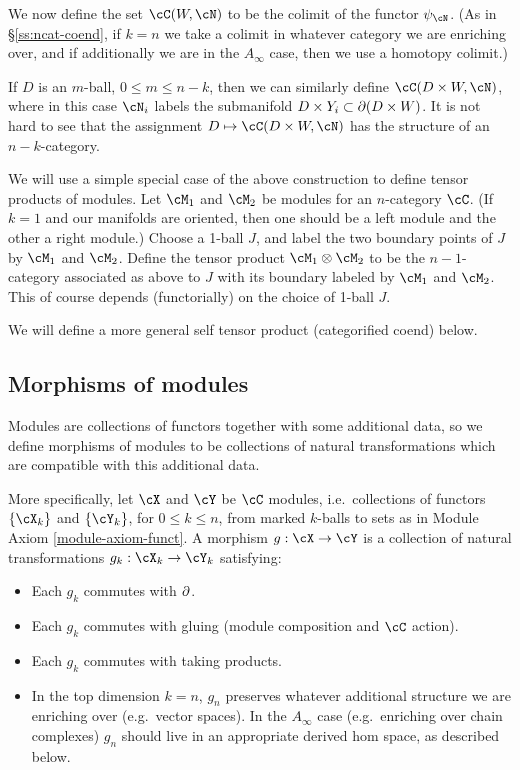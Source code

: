 We now define the set $\cC(W, \cN)$ to be the colimit of the functor $\psi_\cN$.
(As in \S\ref{ss:ncat-coend}, if $k=n$ we take a colimit in whatever
category we are enriching over, and if additionally we are in the $A_\infty$ case, 
then we use a homotopy colimit.)

\medskip

If $D$ is an $m$-ball, $0\le m \le n-k$, then we can similarly define
$\cC(D\times W, \cN)$, where in this case $\cN_i$ labels the submanifold 
$D\times Y_i \subset \partial(D\times W)$.
It is not hard to see that the assignment $D \mapsto \cC(D\times W, \cN)$
has the structure of an $n{-}k$-category.

\medskip

We will use a simple special case of the above 
construction to define tensor products 
of modules.
Let $\cM_1$ and $\cM_2$ be modules for an $n$-category $\cC$.
(If $k=1$ and our manifolds are oriented, then one should be 
a left module and the other a right module.)
Choose a 1-ball $J$, and label the two boundary points of $J$ by $\cM_1$ and $\cM_2$.
Define the tensor product $\cM_1 \tensor \cM_2$ to be the 
$n{-}1$-category associated as above to $J$ with its boundary labeled by $\cM_1$ and $\cM_2$.
This of course depends (functorially)
on the choice of 1-ball $J$.

We will define a more general self tensor product (categorified coend) below.




\subsection{Morphisms of modules}
\label{ss:module-morphisms}

Modules are collections of functors together with some additional data, so we define morphisms
of modules to be collections of natural transformations which are compatible with this
additional data.

More specifically, let $\cX$ and $\cY$ be $\cC$ modules, i.e.\ collections of functors
$\{\cX_k\}$ and $\{\cY_k\}$, for $0\le k\le n$, from marked $k$-balls to sets 
as in Module Axiom \ref{module-axiom-funct}.
A morphism $g:\cX\to\cY$ is a collection of natural transformations $g_k:\cX_k\to\cY_k$
satisfying:
\begin{itemize}
\item Each $g_k$ commutes with $\partial$.
\item Each $g_k$ commutes with gluing (module composition and $\cC$ action).
\item Each $g_k$ commutes with taking products.
\item In the top dimension $k=n$, $g_n$ preserves whatever additional structure we are enriching over (e.g.\ vector
spaces).
In the $A_\infty$ case (e.g.\ enriching over chain complexes) $g_n$ should live in 
an appropriate derived hom space, as described below.
\end{itemize}

